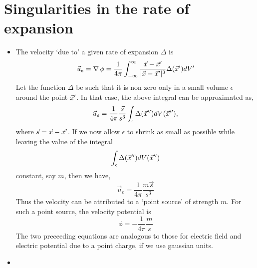 \section{Singularities in the rate of expansion}
\begin{itemize}
\item The velocity \enquote*{due to} a given rate of expansion $\Delta$ is
\[
\vec{u}_e = \operatorname{\nabla}{\phi} = \frac{1}{4\pi}\int_{-\infty}^{\infty} \frac{\vec{x} - \vec{x}^\prime}{|\vec{x}-\vec{x}^\prime|^3}\Delta(\vec{x}^\prime)dV^\prime
\]
Let the function $\Delta$ be such that it is non zero only in a small volume $\epsilon$ around the point $\vec{x}^\prime$. In that case, the above integral can be approximated as,
\[
\vec{u}_e = \frac{1}{4\pi}\frac{\vec{s}}{s^3}\int_{\epsilon} \Delta(\vec{x}^{\prime\prime}) dV(\vec{x}^{\prime\prime}),
\]
where $\vec{s} = \vec{x} - \vec{x}^\prime$. If we now allow $\epsilon$ to shrink as small as possible while leaving the value of the integral
\[
\int_{\epsilon} \Delta(\vec{x}^{\prime\prime}) dV(\vec{x}^{\prime\prime})
\]
constant, say $m$, then we have,
\[
\vec{u}_e = \frac{1}{4\pi} \frac{m\vec{s}}{s^3}
\]
Thus the velocity can be attributed to a \enquote*{point source} of strength $m$. For such a point source, the velocity potential is
\[
\phi = -\frac{1}{4\pi} \frac{m}{s}
\]
The two preceeding equations are analogous to those for electric field and electric potential due to a point charge, if we use gaussian units.

\item {\color{red}{The remark that the flow on one side of a rigid plane containing a small hole through which fluid is sucked at the rate $M$ units of volume per second is 
approximately the same as the flow produced in an unbounded fluid by a point source of strength $-M$ is not clear to me.}}


\end{itemize}
